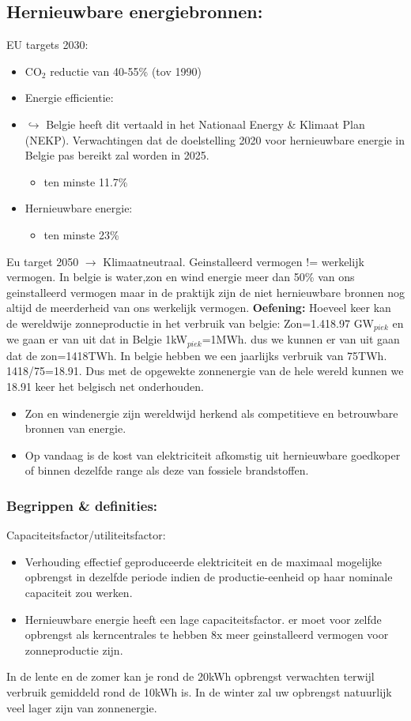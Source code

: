 \documentclass[12pt]{article}
\begin{document}
\subsection{Hernieuwbare energiebronnen:}
EU targets 2030:\begin{itemize}
    \item CO$_2$ reductie van 40-55\% (tov 1990)
    \item Energie efficientie:
    \item[]$\hookrightarrow$ Belgie heeft dit vertaald in het Nationaal Energy \& Klimaat Plan (NEKP). Verwachtingen dat de doelstelling 2020 voor hernieuwbare energie in Belgie pas bereikt zal worden in 2025.
    \begin{itemize}
        \item ten minste 11.7\%
    \end{itemize}
    
    \item Hernieuwbare energie:\begin{itemize}
        \item ten minste 23\%
    \end{itemize}
\end{itemize}
Eu target 2050 $\rightarrow$ Klimaatneutraal.\newline
Geinstalleerd vermogen != werkelijk vermogen. In belgie is water,zon en wind energie meer dan 50\% van ons geinstalleerd vermogen maar in de praktijk zijn de niet hernieuwbare bronnen nog altijd de meerderheid van ons werkelijk vermogen.
\textbf{Oefening:}
Hoeveel keer kan de wereldwije zonneproductie in het verbruik van belgie:
Zon=1.418.97 GW$_{piek}$ en we gaan er van uit dat in Belgie 1kW$_{piek}$=1MWh. dus we kunnen er van uit gaan dat de zon=1418TWh. In belgie hebben we een jaarlijks verbruik van 75TWh. 1418/75=18.91. Dus met de opgewekte zonnenergie van de hele wereld kunnen we 18.91 keer het belgisch net onderhouden.
\begin{itemize}
    \item Zon en windenergie zijn wereldwijd herkend als competitieve en betrouwbare bronnen van energie.
    \item Op vandaag is de kost van elektriciteit afkomstig uit hernieuwbare goedkoper of binnen dezelfde range als deze van fossiele brandstoffen.
\end{itemize}
\subsubsection{Begrippen \& definities:}
Capaciteitsfactor/utiliteitsfactor:\begin{itemize}
    \item Verhouding effectief geproduceerde elektriciteit en de maximaal mogelijke opbrengst in dezelfde periode indien de productie-eenheid op haar nominale capaciteit zou werken.
    \item Hernieuwbare energie heeft een lage capaciteitsfactor. er moet voor zelfde opbrengst als kerncentrales te hebben 8x meer geinstalleerd vermogen voor zonneproductie zijn.
\end{itemize}
In de lente en de zomer kan je rond de 20kWh opbrengst verwachten terwijl verbruik gemiddeld rond de 10kWh is. In de winter zal uw opbrengst natuurlijk veel lager zijn van zonnenergie.
\end{document}
